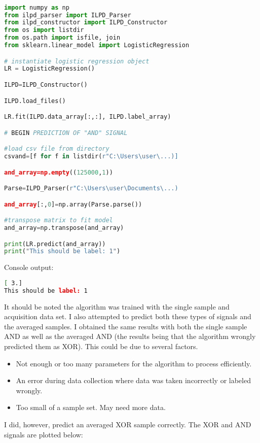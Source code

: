 \documentclass{article}
\begin{document}
\begin{lstlisting}[language=Python]

import numpy as np
from ilpd_parser import ILPD_Parser
from ilpd_constructor import ILPD_Constructor
from os import listdir
from os.path import isfile, join
from sklearn.linear_model import LogisticRegression

# instantiate logistic regression object
LR = LogisticRegression()  

ILPD=ILPD_Constructor()

ILPD.load_files()

LR.fit(ILPD.data_array[:,:], ILPD.label_array)

# BEGIN PREDICTION OF "AND" SIGNAL 

#load csv file from directory 
csvand=[f for f in listdir(r"C:\Users\user\...)]

and_array=np.empty((125000,1))

Parse=ILPD_Parser(r"C:\Users\user\Documents\...)

and_array[:,0]=np.array(Parse.parse())

#transpose matrix to fit model
and_array=np.transpose(and_array)

print(LR.predict(and_array))
print("This should be label: 1")

\end{lstlisting}

Console output:
\begin{lstlisting}[language=bash]
[ 3.]
This should be label: 1
\end{lstlisting}

It should be noted the algorithm was trained with the single sample and acquisition data set. I also attempted to predict both these types of signals and the averaged samples. I obtained the same results with both the single sample AND as well as the averaged AND (the results being that the algorithm wrongly predicted them as XOR). This could be due to several factors.
\begin{itemize}
  \item Not enough or too many parameters for the algorithm to process efficiently.
  \item An error during data collection where data was taken incorrectly or labeled wrongly. 
  \item Too small of a sample set. May need more data.
\end{itemize}

I did, however, predict an averaged XOR sample correctly. The XOR and AND signals are plotted below:
\end{document}
